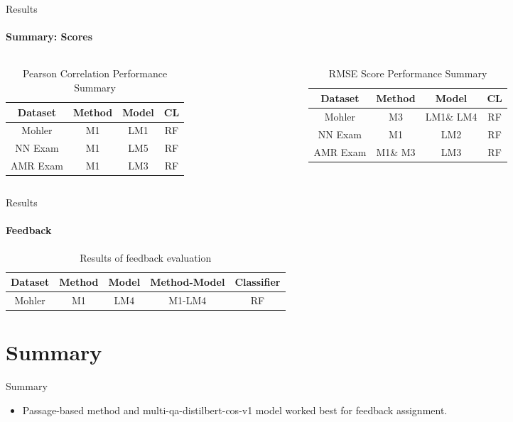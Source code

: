 \documentclass[aspectratio=169]{beamer}
\begin{document}
\begin{frame}{Results}
	\framesubtitle{Summary: Scores}
	\begin{columns}
		\begin{column}{0.5\textwidth}
			\begin{table}
				\centering
				\begin{tabular}{|c|c|c|c|}
					\hline
					Dataset & Method & Model & CL \\
					\hline
					Mohler & M1 & LM1& RF \\
					\hline
					NN Exam & M1 & LM5 & RF\\
					\hline
					AMR Exam & M1& LM3 & RF\\
					\hline	
				\end{tabular}
			\caption{Pearson Correlation Performance Summary}
			\end{table}
		\end{column}
		\begin{column}{0.5\textwidth}
			\begin{table}
			\centering
			\begin{tabular}{|c|c|c|c|}
				\hline
				Dataset & Method & Model & CL \\
				\hline
				Mohler & M3 & LM1\& LM4& RF \\
				\hline
				NN Exam & M1 & LM2 & RF\\
				\hline
				AMR Exam & M1\& M3 & LM3 & RF\\
				\hline	
			\end{tabular}
			\caption{RMSE Score Performance Summary}
		\end{table}
		\end{column}
	\end{columns}
\end{frame}
\begin{frame}{Results}
	\framesubtitle{Feedback}
	\begin{table}
		\centering
		\begin{tabular}{|c|c|c|c|c|}
			\hline
			Dataset & Method & Model & Method-Model & Classifier \\
			\hline
			Mohler & M1 & LM4 & M1-LM4 & RF \\
			\hline
		\end{tabular}
	\caption{Results of feedback evaluation}
	\end{table}
\end{frame}
\section{Summary}
\begin{frame}{Summary}
	\begin{itemize}
		\item Passage-based method and multi-qa-distilbert-cos-v1 model worked best for feedback assignment.
		
	\end{itemize}
\end{frame}
\end{document}
